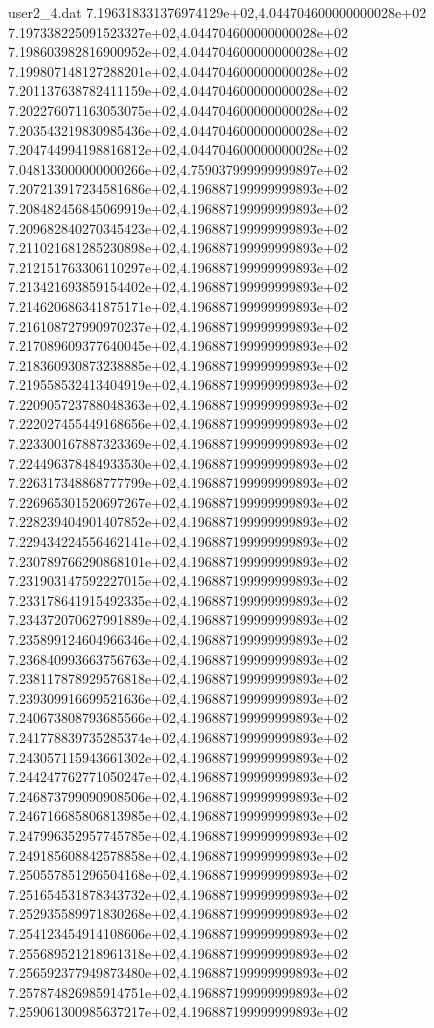 \begin{filecontents}{user2_4.dat}
7.196318331376974129e+02,4.044704600000000028e+02
7.197338225091523327e+02,4.044704600000000028e+02
7.198603982816900952e+02,4.044704600000000028e+02
7.199807148127288201e+02,4.044704600000000028e+02
7.201137638782411159e+02,4.044704600000000028e+02
7.202276071163053075e+02,4.044704600000000028e+02
7.203543219830985436e+02,4.044704600000000028e+02
7.204744994198816812e+02,4.044704600000000028e+02
7.048133000000000266e+02,4.759037999999999897e+02
7.207213917234581686e+02,4.196887199999999893e+02
7.208482456845069919e+02,4.196887199999999893e+02
7.209682840270345423e+02,4.196887199999999893e+02
7.211021681285230898e+02,4.196887199999999893e+02
7.212151763306110297e+02,4.196887199999999893e+02
7.213421693859154402e+02,4.196887199999999893e+02
7.214620686341875171e+02,4.196887199999999893e+02
7.216108727990970237e+02,4.196887199999999893e+02
7.217089609377640045e+02,4.196887199999999893e+02
7.218360930873238885e+02,4.196887199999999893e+02
7.219558532413404919e+02,4.196887199999999893e+02
7.220905723788048363e+02,4.196887199999999893e+02
7.222027455449168656e+02,4.196887199999999893e+02
7.223300167887323369e+02,4.196887199999999893e+02
7.224496378484933530e+02,4.196887199999999893e+02
7.226317348868777799e+02,4.196887199999999893e+02
7.226965301520697267e+02,4.196887199999999893e+02
7.228239404901407852e+02,4.196887199999999893e+02
7.229434224556462141e+02,4.196887199999999893e+02
7.230789766290868101e+02,4.196887199999999893e+02
7.231903147592227015e+02,4.196887199999999893e+02
7.233178641915492335e+02,4.196887199999999893e+02
7.234372070627991889e+02,4.196887199999999893e+02
7.235899124604966346e+02,4.196887199999999893e+02
7.236840993663756763e+02,4.196887199999999893e+02
7.238117878929576818e+02,4.196887199999999893e+02
7.239309916699521636e+02,4.196887199999999893e+02
7.240673808793685566e+02,4.196887199999999893e+02
7.241778839735285374e+02,4.196887199999999893e+02
7.243057115943661302e+02,4.196887199999999893e+02
7.244247762771050247e+02,4.196887199999999893e+02
7.246873799090908506e+02,4.196887199999999893e+02
7.246716685806813985e+02,4.196887199999999893e+02
7.247996352957745785e+02,4.196887199999999893e+02
7.249185608842578858e+02,4.196887199999999893e+02
7.250557851296504168e+02,4.196887199999999893e+02
7.251654531878343732e+02,4.196887199999999893e+02
7.252935589971830268e+02,4.196887199999999893e+02
7.254123454914108606e+02,4.196887199999999893e+02
7.255689521218961318e+02,4.196887199999999893e+02
7.256592377949873480e+02,4.196887199999999893e+02
7.257874826985914751e+02,4.196887199999999893e+02
7.259061300985637217e+02,4.196887199999999893e+02

\end{filecontents}
